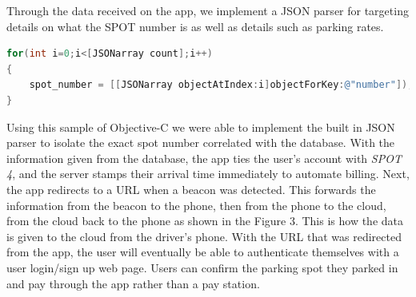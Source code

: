 Through the data received on the app, we implement a JSON parser for targeting details on what the SPOT number is as well as details such as parking rates.
\begin{lstlisting}[language=C]
for(int i=0;i<[JSONarray count];i++)
{
    spot_number = [[JSONarray objectAtIndex:i]objectForKey:@"number"]);
}
\end{lstlisting}
Using this sample of Objective-C we were able to implement the built in JSON parser to isolate the exact spot number correlated with the database.
With the information given from the database, the app ties the user's account with \textit{SPOT 4}, and the server stamps their arrival time immediately to automate billing.
Next, the app redirects to a URL when a beacon was detected. 
This forwards the information from the beacon to the phone, then from the phone to the cloud, from the cloud back to the phone as shown in the Figure 3. 
This is how the data is given to the cloud from the driver's phone.
With the URL that was redirected from the app, the user will eventually be able to authenticate themselves with a user login/sign up web page. 
Users can confirm the parking spot they parked in and pay through the app rather than a pay station.  
